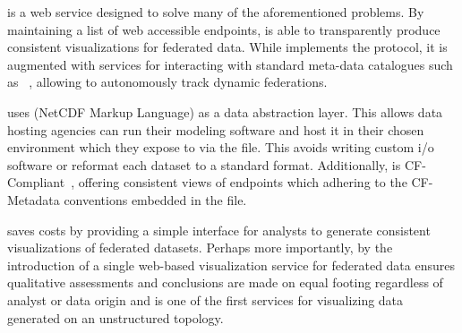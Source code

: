 \sciwms{} is a web service designed to solve many of the
aforementioned problems. By maintaining a list of web accessible
endpoints, \sciwms{} is able to transparently produce consistent
visualizations for federated data. While \sciwms{} implements the
\ogc{} \wms{} protocol, it is augmented with services for interacting
with standard meta-data catalogues such as \csw{}~\cite{csw14},
allowing \sciwms{} to autonomously track dynamic federations.

\sciwms{} uses \ncml{} (NetCDF Markup Language) as a data abstraction
layer. This allows data hosting agencies can run their modeling
software and host it in their chosen environment which they expose to
\sciwms{} via the \ncml{} file. This avoids writing custom i/o
software or reformat each dataset to a standard format. Additionally,
\sciwms{} is CF-Compliant~\cite{cf}, offering consistent views of
endpoints which adhering to the CF-Metadata conventions embedded in
the \ncml{} file.

\sciwms{} saves costs by providing a simple interface for analysts to
generate consistent visualizations of federated datasets. Perhaps more
importantly, by the introduction of a single web-based visualization
service for federated data ensures qualitative assessments and
conclusions are made on equal footing regardless of analyst or data
origin and is one of the first services for visualizing data generated
on an unstructured topology.
